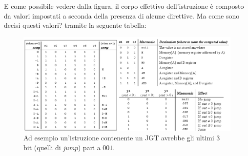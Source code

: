 \documentclass[12pt]{article}
\begin{document}
E come possibile vedere dalla figura, il corpo effettivo dell'istruzione è composto da valori impostati a seconda della presenza di alcune direttive. Ma come sono decisi questi valori? tramite la seguente tabella:
\begin{figure}[H]
    \centering
    \includegraphics[width=1\textwidth, height=.7\textheight,keepaspectratio]{realizzare_HACK/tabella_c_instruction.png} %
    \begin{center}
        \caption{\label{fig:c_instruction_tabella}Ad esempio un'istruzione contenente un JGT avrebbe gli ultimi 3 bit (quelli di \textit{jump}) pari a $001$.} %
    \end{center}
\end{figure}
\end{document}
